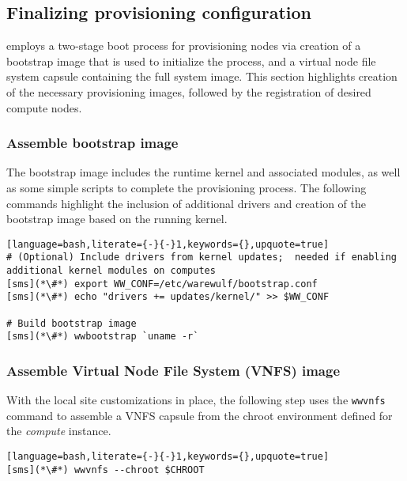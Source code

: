 \subsection{Finalizing provisioning configuration} \label{sec:assemble_bootstrap}

\Warewulf{} employs a two-stage boot process for provisioning nodes via
creation of a bootstrap image that is used to initialize the process, and a virtual node
file system capsule containing the full system image. This section highlights
creation of the necessary provisioning images, followed by the registration of
desired compute nodes.

\subsubsection{Assemble bootstrap image}

The bootstrap image includes the runtime kernel and associated modules, as well
as some simple scripts to complete the provisioning process. The
following commands highlight the inclusion of additional drivers and creation
of the bootstrap image based on the running kernel.


\begin{lstlisting}[language=bash,literate={-}{-}1,keywords={},upquote=true]
# (Optional) Include drivers from kernel updates;  needed if enabling additional kernel modules on computes
[sms](*\#*) export WW_CONF=/etc/warewulf/bootstrap.conf
[sms](*\#*) echo "drivers += updates/kernel/" >> $WW_CONF

# Build bootstrap image
[sms](*\#*) wwbootstrap `uname -r`
\end{lstlisting}

\subsubsection{Assemble Virtual Node File System (VNFS) image}

With the local site customizations in place, the following step uses the
\texttt{wwvnfs} command to assemble a VNFS capsule from the chroot environment
defined for the {\em compute} instance.

\begin{lstlisting}[language=bash,literate={-}{-}1,keywords={},upquote=true]
[sms](*\#*) wwvnfs --chroot $CHROOT
\end{lstlisting}

